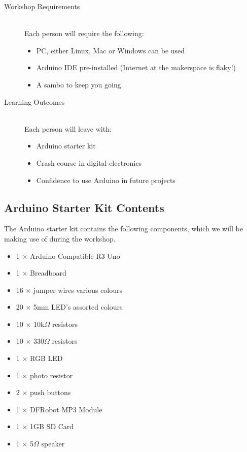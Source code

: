 \begin{description}
	\item[Workshop Requirements] \hfill \\
	Each person will require the following:
	\begin{itemize}
		\item PC, either Linux, Mac or Windows can be used
		\item Arduino IDE pre-installed (Internet at the makerspace is flaky!)
		\item A sambo to keep you going
	\end{itemize}
	
	\item[Learning Outcomes] \hfill \\
	Each person will leave with:
	\begin{itemize}
		\item Arduino starter kit
		\item Crash course in digital electronics
		\item Confidence to use Arduino in future projects
	\end{itemize}
\end{description}

\subsection*{Arduino Starter Kit Contents}
The Arduino starter kit contains the following components, which we will be making use of during the workshop.

\begin{itemize}
	\item 1 $\times$ Arduino Compatible R3 Uno
	\item 1 $\times$ Breadboard
	\item 16 $\times$ jumper wires various colours
	\item 20 $\times$ 5mm LED's assorted colours
	\item 10 $\times$ 10k$\Omega$ resistors
	\item 10 $\times$ 330$\Omega$ resistors
	\item 1 $\times$ RGB LED
	\item 1 $\times$ photo resistor
	\item 2 $\times$ push buttons
	\item 1 $\times$ DFRobot MP3 Module
	\item 1 $\times$ 1GB SD Card
	\item 1 $\times$ 5$\Omega$ speaker
\end{itemize}


